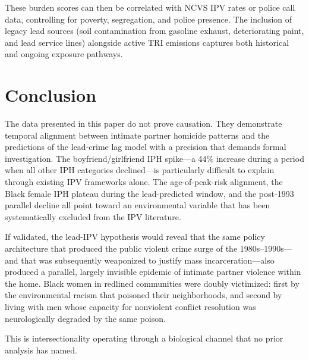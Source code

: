 \documentclass[12pt, letterpaper]{article}
\begin{document}
\noindent These burden scores can then be correlated with NCVS IPV rates or police call data, controlling for poverty, segregation, and police presence. The inclusion of legacy lead sources (soil contamination from gasoline exhaust, deteriorating paint, and lead service lines) alongside active TRI emissions captures both historical and ongoing exposure pathways.

\section{Conclusion}

The data presented in this paper do not prove causation. They demonstrate temporal alignment between intimate partner homicide patterns and the predictions of the lead-crime lag model with a precision that demands formal investigation. The boyfriend/girlfriend IPH spike---a 44\% increase during a period when all other IPH categories declined---is particularly difficult to explain through existing IPV frameworks alone. The age-of-peak-risk alignment, the Black female IPH plateau during the lead-predicted window, and the post-1993 parallel decline all point toward an environmental variable that has been systematically excluded from the IPV literature.

If validated, the lead-IPV hypothesis would reveal that the same policy architecture that produced the public violent crime surge of the 1980s--1990s---and that was subsequently weaponized to justify mass incarceration---also produced a parallel, largely invisible epidemic of intimate partner violence within the home. Black women in redlined communities were doubly victimized: first by the environmental racism that poisoned their neighborhoods, and second by living with men whose capacity for nonviolent conflict resolution was neurologically degraded by the same poison.

This is intersectionality operating through a biological channel that no prior analysis has named.


\end{document}
